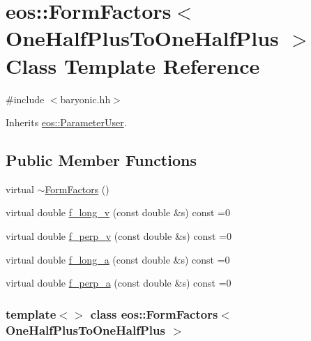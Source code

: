 \hypertarget{classeos_1_1FormFactors_3_01OneHalfPlusToOneHalfPlus_01_4}{
\section{eos::FormFactors$<$ OneHalfPlusToOneHalfPlus $>$ Class Template Reference}
\label{classeos_1_1FormFactors_3_01OneHalfPlusToOneHalfPlus_01_4}
}


{\ttfamily \#include $<$baryonic.hh$>$}

Inherits \hyperlink{classeos_1_1ParameterUser}{eos::ParameterUser}.\subsection*{Public Member Functions}
\begin{DoxyCompactItemize}
\item 
virtual \hyperlink{classeos_1_1FormFactors_3_01OneHalfPlusToOneHalfPlus_01_4_ad1d749d5f305db904000c4e4635d62ed}{$\sim$FormFactors} ()
\item 
virtual double \hyperlink{classeos_1_1FormFactors_3_01OneHalfPlusToOneHalfPlus_01_4_a290adf860a3a7a206f9b74af824735ec}{f\_\-long\_\-v} (const double \&s) const =0
\item 
virtual double \hyperlink{classeos_1_1FormFactors_3_01OneHalfPlusToOneHalfPlus_01_4_a7529b97bf3272ecfaf71f68681f14f89}{f\_\-perp\_\-v} (const double \&s) const =0
\item 
virtual double \hyperlink{classeos_1_1FormFactors_3_01OneHalfPlusToOneHalfPlus_01_4_a1864b61e70ad83bed15695a5726a764a}{f\_\-long\_\-a} (const double \&s) const =0
\item 
virtual double \hyperlink{classeos_1_1FormFactors_3_01OneHalfPlusToOneHalfPlus_01_4_adf134b63172b8dc387be13e7cf576e4c}{f\_\-perp\_\-a} (const double \&s) const =0
\end{DoxyCompactItemize}
\subsubsection*{template$<$$>$ class eos::FormFactors$<$ OneHalfPlusToOneHalfPlus $>$}



